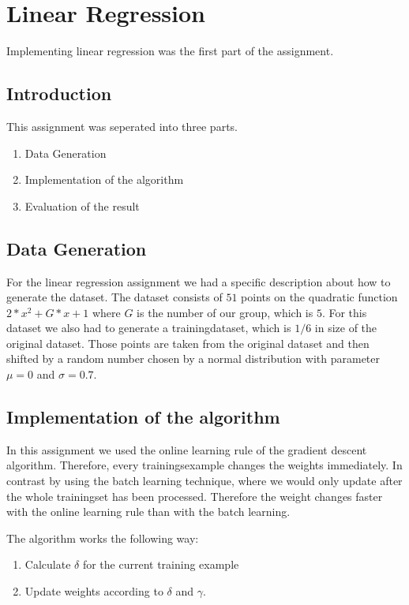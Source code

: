 \section{Linear Regression}

Implementing linear regression was the first part of the assignment.

\subsection{Introduction}

This assignment was seperated into three parts.
\begin{enumerate}
	\item Data Generation
	\item Implementation of the algorithm
	\item Evaluation of the result
\end{enumerate}

\subsection{Data Generation}
\label{sec:dataGen}

For the linear regression assignment we had a specific description about how to generate the dataset. The dataset consists of $51$ points on the quadratic function $2*x^2 + G*x + 1$ where $G$ is the number of our group, which is $5$. For this dataset we also had to generate a trainingdataset, which is $1/6$ in size of the original dataset. Those points are taken from the original dataset and then shifted by a random number chosen by a normal distribution with parameter $\mu = 0$ and $\sigma = 0.7$.

\subsection{Implementation of the algorithm}

In this assignment we used the online learning rule of the gradient descent algorithm. Therefore, every trainingsexample changes the weights immediately. In contrast by using the batch learning technique, where we would only update after the whole trainingset has been processed. Therefore the weight changes faster with the online learning rule than with the batch learning.

The algorithm works the following way:
\begin{enumerate}
	\item Calculate $\delta$ for the current training example
	\item Update weights according to $\delta$ and $\gamma$.
\end{enumerate}

